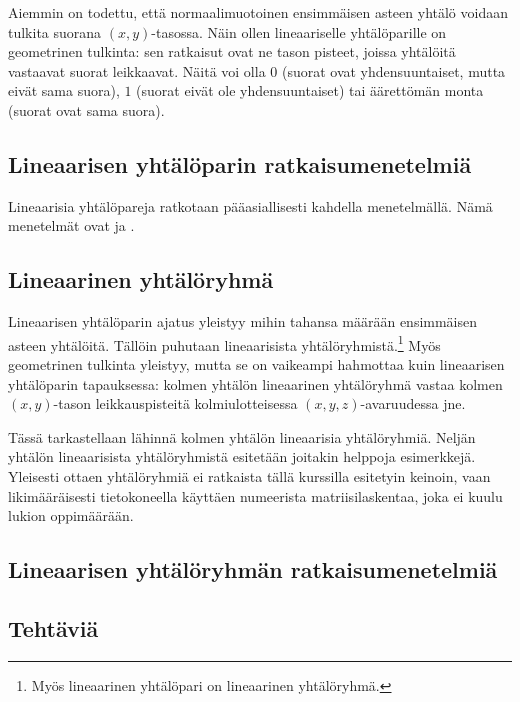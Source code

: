 Aiemmin on todettu, että normaalimuotoinen ensimmäisen asteen yhtälö voidaan tulkita suorana
$(x, y)$-tasossa. Näin ollen lineaariselle yhtälöparille on geometrinen tulkinta: sen
ratkaisut ovat ne tason pisteet, joissa yhtälöitä vastaavat
suorat leikkaavat. Näitä voi olla
$0$ (suorat ovat yhdensuuntaiset, mutta eivät sama suora),
$1$ (suorat eivät ole yhdensuuntaiset) tai
äärettömän monta (suorat ovat sama suora).


\subsection*{Lineaarisen yhtälöparin ratkaisumenetelmiä}

Lineaarisia yhtälöpareja ratkotaan pääasiallisesti kahdella menetelmällä.
Nämä menetelmät ovat  ja
.


\subsection*{Lineaarinen yhtälöryhmä}

Lineaarisen yhtälöparin ajatus yleistyy mihin tahansa määrään ensimmäisen asteen yhtälöitä.
Tällöin puhutaan lineaarisista yhtälöryhmistä.\footnote{Myös lineaarinen yhtälöpari on lineaarinen yhtälöryhmä.}
Myös geometrinen tulkinta yleistyy, mutta se on vaikeampi hahmottaa kuin lineaarisen yhtälöparin tapauksessa:
kolmen yhtälön lineaarinen yhtälöryhmä vastaa kolmen $(x, y)$-tason leikkauspisteitä
kolmiulotteisessa $(x, y, z)$-avaruudessa jne.

Tässä tarkastellaan lähinnä kolmen yhtälön lineaarisia yhtälöryhmiä. Neljän yhtälön
lineaarisista yhtälöryhmistä esitetään joitakin helppoja esimerkkejä. Yleisesti ottaen yhtälöryhmiä
ei ratkaista tällä kurssilla esitetyin keinoin, vaan likimääräisesti tietokoneella käyttäen numeerista 
matriisilaskentaa, joka ei kuulu lukion oppimäärään.

\subsection*{Lineaarisen yhtälöryhmän ratkaisumenetelmiä}


\subsection*{Tehtäviä}


